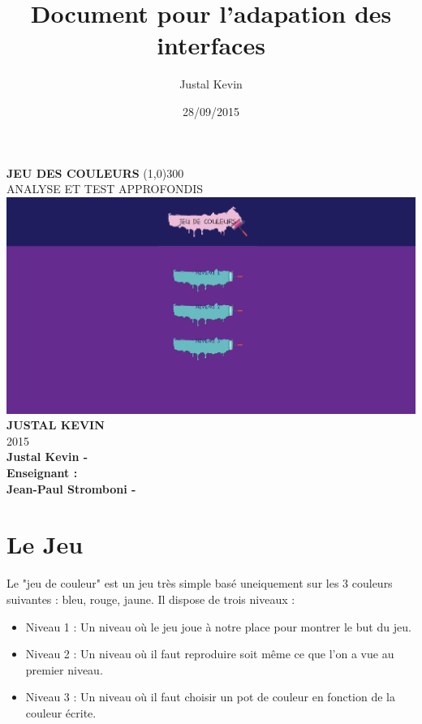\documentclass{article}
\title{Document pour l'adapation des interfaces}
\author{Justal Kevin}
\date{28/09/2015}
\begin{document}
\begin{center}
\textbf{\Huge{JEU DES COULEURS}}
\line(1,0){300}\\
ANALYSE ET TEST APPROFONDIS\\
\vspace{3cm}
\includegraphics[width=\textwidth]{2}\\
\vspace{3cm}
\textbf{\Large{JUSTAL KEVIN}}\\
2015\\
\vspace{2cm}
\textbf{Justal Kevin -  \color{black}{- SI5 - IHM}}\\
\vspace{4cm}
\textbf{Enseignant :}\\
\textbf{Jean-Paul Stromboni - }
\end{center}

\newpage
\tableofcontents

\newpage

\section{Le Jeu}

Le "jeu de couleur" est un jeu très simple basé uneiquement sur les 3 couleurs suivantes : bleu, rouge, jaune. Il dispose de trois niveaux :\\
\begin{itemize}
\item Niveau 1 : Un niveau où le jeu joue à notre place pour montrer le but du jeu.
\item Niveau 2 : Un niveau où il faut reproduire soit même ce que l'on a vue au premier niveau.
\item Niveau 3 : Un niveau où il faut choisir un pot de couleur en fonction de la couleur écrite.
\end{itemize}
\vspace{0.4cm}
\end{document}
